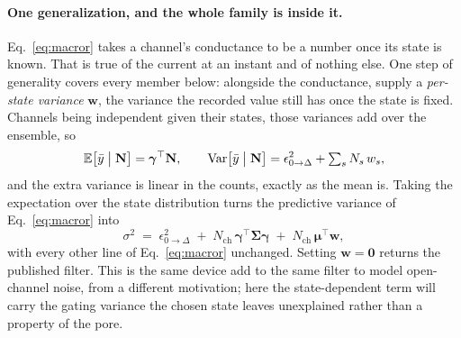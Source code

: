 \begin{appendixbox}
\paragraph{One generalization, and the whole family is inside it.}
Eq.~\ref{eq:macror} takes a channel's conductance to be a number once its state is known. That is
true of the current at an instant and of nothing else. One step of generality covers every member
below: alongside the conductance, supply a \emph{per-state variance} $\mathbf{w}$, the variance the
recorded value still has once the state is fixed. Channels being independent given their states,
those variances add over the ensemble, so
\begin{equation}
  \mathbb{E}\bigl[\bar y \bigm| \mathbf{N}\bigr]=\boldsymbol{\gamma}^\top\mathbf{N},
  \qquad
  \mathrm{Var}\bigl[\bar y \bigm| \mathbf{N}\bigr]
    =\epsilon^2_{0\to\Delta}+\textstyle\sum_s N_s\,w_s ,
  \label{eq:emission}
\end{equation}
and the extra variance is linear in the counts, exactly as the mean is. Taking the expectation over
the state distribution turns the predictive variance of Eq.~\ref{eq:macror} into
\begin{equation}
  \sigma^2 \;=\; \epsilon^2_{0\to\Delta}
    \;+\; N_{\mathrm{ch}}\,\boldsymbol{\gamma}^\top\boldsymbol{\Sigma}\boldsymbol{\gamma}
    \;+\; N_{\mathrm{ch}}\,\boldsymbol{\mu}^\top\mathbf{w},
  \label{eq:macror-w}
\end{equation}
with every other line of Eq.~\ref{eq:macror} unchanged. Setting $\mathbf{w}=\boldsymbol{0}$ returns the
published filter. This is the same device \citet{munch2022bayesian} add to the same filter to model
open-channel noise, from a different motivation; here the state-dependent term will carry the
gating variance the chosen state leaves unexplained rather than a property of the pore.


\end{appendixbox}
